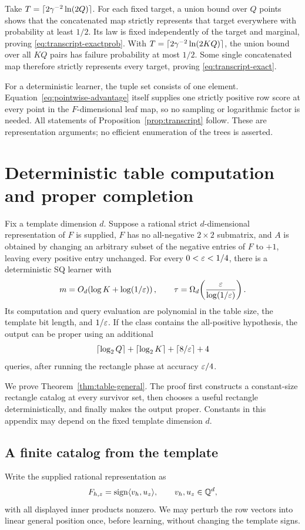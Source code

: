 Take $T=\lceil 2\gamma^{-2}\ln(2Q)\rceil$. For each fixed target, a union bound over $Q$ points shows that the concatenated map strictly represents that target everywhere with probability at least $1/2$. Its law is fixed independently of the target and marginal, proving \eqref{eq:transcript-exactprob}. With $T=\lceil 2\gamma^{-2}\ln(2KQ)\rceil$, the union bound over all $KQ$ pairs has failure probability at most $1/2$. Some single concatenated map therefore strictly represents every target, proving \eqref{eq:transcript-exact}.

For a deterministic learner, the tuple set consists of one element. Equation~\eqref{eq:pointwise-advantage} itself supplies one strictly positive row score at every point in the $F$-dimensional leaf map, so no sampling or logarithmic factor is needed. All statements of Proposition~\ref{prop:transcript} follow. These are representation arguments; no efficient enumeration of the trees is asserted.

\section{Deterministic table computation and proper completion}
\label{app:proper}
\begin{theorem}
\label{thm:table-general}
Fix a template dimension $d$. Suppose a rational strict $d$-dimensional representation of $F$ is supplied, $F$ has no all-negative $2\times2$ submatrix, and $A$ is obtained by changing an arbitrary subset of the negative entries of $F$ to $+1$, leaving every positive entry unchanged. For every $0<\varepsilon<1/4$, there is a deterministic SQ learner with
\[
 m=O_d\!\left(\log K+\log(1/\varepsilon)\right),\qquad
 \tau=\Omega_d\!\left(\frac{\varepsilon}{\log(1/\varepsilon)}\right).
\]
Its computation and query evaluation are polynomial in the table size, the template bit length, and $1/\varepsilon$. If the class contains the all-positive hypothesis, the output can be proper using an additional
\[
 \lceil \log_2Q\rceil+\lceil \log_2K\rceil+\lceil 8/\varepsilon\rceil+4
\]
queries, after running the rectangle phase at accuracy $\varepsilon/4$.
\end{theorem}

We prove Theorem~\ref{thm:table-general}. The proof first constructs a constant-size rectangle catalog at every survivor set, then chooses a useful rectangle deterministically, and finally makes the output proper. Constants in this appendix may depend on the fixed template dimension $d$.

\subsection{A finite catalog from the template}
Write the supplied rational representation as
\[
 F_{h,z}=\operatorname{sign}\langle v_h,u_z\rangle,\qquad v_h,u_z\in\mathbb Q^d,
\]
with all displayed inner products nonzero. We may perturb the row vectors into linear general position once, before learning, without changing the template signs.

